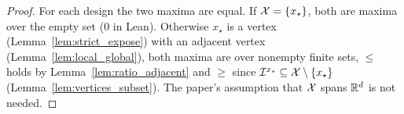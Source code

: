 \begin{proof}
  \leanok
  For each design the two maxima are equal. If $\mathcal{X} = \{x_\star\}$, both are maxima over the empty
  set ($0$ in Lean). Otherwise $x_\star$ is a vertex (Lemma~\ref{lem:strict_expose}) with an adjacent
  vertex (Lemma~\ref{lem:local_global}), both maxima are over nonempty finite sets, $\le$ holds by
  Lemma~\ref{lem:ratio_adjacent} and $\ge$ since $\mathcal{I}^{x_\star} \subseteq \mathcal{X} \setminus \{x_\star\}$
  (Lemma~\ref{lem:vertices_subset}). The paper's assumption that $\mathcal{X}$ spans $\mathbb{R}^d$ is not needed.
\end{proof}
